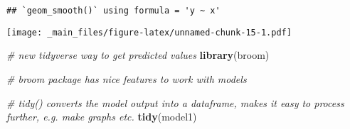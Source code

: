 \documentclass[
]{book}
\newenvironment{Shaded}{\begin{snugshade}}{\end{snugshade}}
\newcommand{\AttributeTok}[1]{\textcolor[rgb]{0.13,0.29,0.53}{#1}}
\newcommand{\CommentTok}[1]{\textcolor[rgb]{0.56,0.35,0.01}{\textit{#1}}}
\newcommand{\FunctionTok}[1]{\textcolor[rgb]{0.13,0.29,0.53}{\textbf{#1}}}
\newcommand{\NormalTok}[1]{#1}
\newcommand{\OtherTok}[1]{\textcolor[rgb]{0.56,0.35,0.01}{#1}}
\newcommand{\SpecialCharTok}[1]{\textcolor[rgb]{0.81,0.36,0.00}{\textbf{#1}}}
\newcommand{\StringTok}[1]{\textcolor[rgb]{0.31,0.60,0.02}{#1}}
\begin{document}
\begin{Shaded}
\end{Shaded}

\begin{verbatim}
## `geom_smooth()` using formula = 'y ~ x'
\end{verbatim}

\texttt{[image: \_main\_files/figure-latex/unnamed-chunk-15-1.pdf]}

\begin{Shaded}
\begin{Highlighting}[]
\CommentTok{\# new tidyverse way to get predicted values}
\FunctionTok{library}\NormalTok{(broom)}

\CommentTok{\# broom package has nice features to work with models}

\CommentTok{\# tidy() converts the model output into a dataframe, makes it easy to process further, e.g. make graphs etc.}
\FunctionTok{tidy}\NormalTok{(model1)}
\end{Highlighting}
\end{Shaded}
\end{document}
